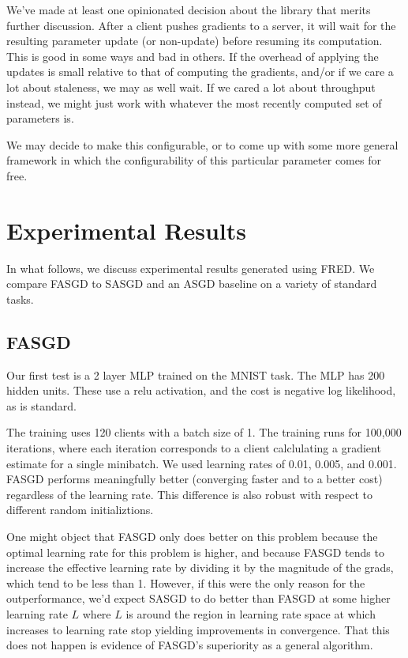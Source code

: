 \documentclass{article} %
\begin{document}
We've made at least one opinionated decision about the library that merits further discussion.
After a client pushes gradients to a server, it will wait for the resulting parameter update (or non-update) before
resuming its computation. This is good in some ways and bad in others. If the overhead of applying the updates is
small relative to that of computing the gradients, and/or if we care a lot about staleness, we may as well wait.
If we cared a lot about throughput instead, we might just work with whatever the most recently computed set of parameters is.

We may decide to make this configurable, or to come up with some more general framework in which the configurability
of this particular parameter comes for free.

\vspace{-0.1mm}

\section{Experimental Results}
\label{expts}

In what follows, we discuss experimental results generated using FRED.
We compare FASGD to SASGD and an ASGD baseline on a variety of standard tasks.

\subsection{FASGD}

Our first test is a 2 layer MLP trained on the MNIST task.
The MLP has 200 hidden units.
These use a relu activation, and the cost is negative log likelihood,
as is standard.

The training uses 120 clients with a batch size of 1.
The training runs for 100,000 iterations,
where each iteration corresponds to a client calclulating
a gradient estimate for a single minibatch.
We used learning rates of 0.01, 0.005, and 0.001.
FASGD performs meaningfully better (converging faster and to a better cost)
regardless of the learning rate.
This difference is also robust with respect to different random
initializtions.

One might object that FASGD only does better on this problem because
the optimal learning rate for this problem is higher, and because
FASGD tends to increase the effective learning rate by dividing
it by the magnitude of the grads, which tend to be less than 1.
However, if this were the only reason for the outperformance,
we'd expect SASGD to do better than FASGD at some higher learning
rate $L$ where $L$ is around the region in learning rate space
at which increases to learning rate stop yielding improvements
in convergence. That this does not happen is evidence of
FASGD's superiority as a general algorithm.
\end{document}
